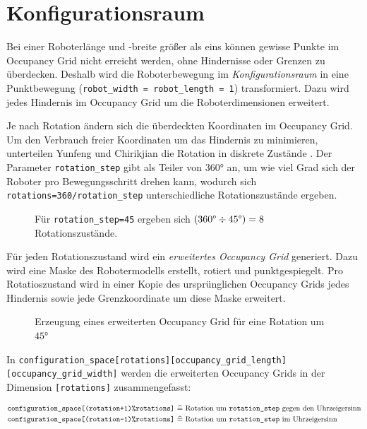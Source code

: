 \chapter{Konfigurationsraum} \label{ch:config-space}
Bei einer Roboterlänge und -breite größer als eins können gewisse Punkte im Occupancy Grid nicht erreicht werden, ohne Hindernisse oder Grenzen zu überdecken. 
Deshalb wird die Roboterbewegung im \textit{Konfigurationsraum} in eine Punktbewegung (\texttt{robot\_width = robot\_length = 1}) transformiert.
Dazu wird jedes Hindernis im Occupancy Grid um die Roboterdimensionen erweitert. \cite{roberts.1999}

Je nach Rotation ändern sich die überdeckten Koordinaten im Occupancy Grid.
Um den Verbrauch freier Koordinaten um das Hindernis zu minimieren, unterteilen Yunfeng und Chirikjian die Rotation in diskrete Zustände \cite{wang.2000}. Der Parameter \texttt{rotation\_step} gibt als Teiler von $360$° an, um wie viel Grad sich der Roboter pro Bewegungsschritt drehen kann, wodurch sich \texttt{rotations=360/\texttt{rotation\_step}} unterschiedliche Rotationszustände ergeben.
\begin{figure}[H]
	\centering
	\footnotesize
	\centerline{\resizebox{0.6\linewidth}{!}{}}
	\caption{Für \texttt{rotation\_step=45} ergeben sich $(360 \text{\textdegree} \div 45 \text{\textdegree}) = 8$ Rotationszustände.}
\end{figure}

\vspace*{-0.2cm}
Für jeden Rotationszustand wird ein \textit{erweitertes Occupancy Grid} generiert. Dazu wird eine Maske des Robotermodells erstellt, rotiert und punktgespiegelt. Pro Rotatioszustand wird in einer Kopie des ursprünglichen Occupancy Grids jedes Hindernis sowie jede Grenzkoordinate um diese Maske erweitert.
\begin{figure}[H]
	\centering
	\footnotesize
	\centerline{\resizebox{0.97\linewidth}{!}{}}
	\caption{Erzeugung eines erweiterten Occupancy Grid für eine Rotation um $45$°}
\end{figure}

In \texttt{configuration\_space[rotations][occupancy\_grid\_length][occupancy\_grid\_width]} werden die erweiterten Occupancy Grids in der Dimension \texttt{[rotations]} zusammengefasst:

\vspace*{-0.5cm}
\hspace*{-0.6cm}
\begin{minipage}{\linewidth}
\begin{align*}
\texttt{configuration\_space[(rotation+1)\%rotations]}\,\,&\widehat{=}\,\,\text{Rotation um \texttt{rotation\_step} gegen den Uhrzeigersinn} \\
\vspace*{0.1cm}
\texttt{configuration\_space[(rotation-1)\%rotations]}\,\,&\widehat{=}\,\,\text{Rotation um \texttt{rotation\_step} im Uhrzeigersinn}
\end{align*}
\end{minipage}

